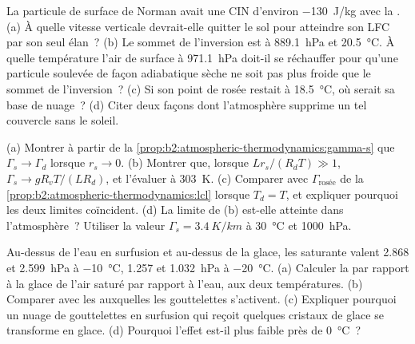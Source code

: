 \begin{exercise}[$\star\star\star$]\label{exo:b2:atmospheric-thermodynamics:10}
La particule de surface de Norman avait une CIN d'environ \qty{-130}{J/kg} avec la . (a) À quelle vitesse verticale devrait-elle quitter le sol pour atteindre son
LFC par son seul élan~? (b) Le sommet de l'inversion est à \qty{889.1}{hPa} et \qty{20.5}{\celsius}.
À quelle température l'air de surface à \qty{971.1}{hPa} doit-il se réchauffer pour
qu'une particule soulevée de façon adiabatique sèche ne soit pas plus froide que le sommet de
l'inversion~? (c) Si son point de rosée restait à \qty{18.5}{\celsius}, où serait sa base
de nuage~? (d) Citer deux façons dont l'atmosphère supprime un tel couvercle sans le soleil.
\end{exercise}

\begin{exercise}[$\star\star\star$]\label{exo:b2:atmospheric-thermodynamics:11}
(a) Montrer à partir de la \cref{prop:b2:atmospheric-thermodynamics:gamma-s} que $\Gamma_s \to \Gamma_d$
lorsque $r_s \to 0$. (b) Montrer que, lorsque $Lr_s/(R_dT) \gg 1$, $\Gamma_s \to gR_vT/(LR_d)$,
et l'évaluer à \qty{303}{K}. (c) Comparer avec $\Gamma_{\text{rosée}}$ de la
\cref{prop:b2:atmospheric-thermodynamics:lcl} lorsque $T_d = T$, et expliquer pourquoi les deux limites
coïncident. (d) La limite de (b) est-elle atteinte dans l'atmosphère~? Utiliser la valeur $\Gamma_s =
\qty{3.4}{K/km}$ à \qty{30}{\celsius} et \qty{1000}{hPa}.
\end{exercise}

\begin{exercise}[$\star\star\star$]\label{exo:b2:atmospheric-thermodynamics:12}
Au-dessus de l'eau en surfusion et au-dessus de la glace, les  saturante valent
2.868 et \qty{2.599}{hPa} à \qty{-10}{\celsius}, 1.257 et \qty{1.032}{hPa} à \qty{-20}{\celsius}.
(a) Calculer la  par rapport à la glace de l'air saturé par rapport à l'eau, aux
deux températures. (b) Comparer avec les  auxquelles les gouttelettes s'activent.
(c) Expliquer pourquoi un nuage de gouttelettes en surfusion qui reçoit quelques cristaux de
glace se transforme en glace. (d) Pourquoi l'effet est-il plus faible près de \qty{0}{\celsius}~?
\end{exercise}

